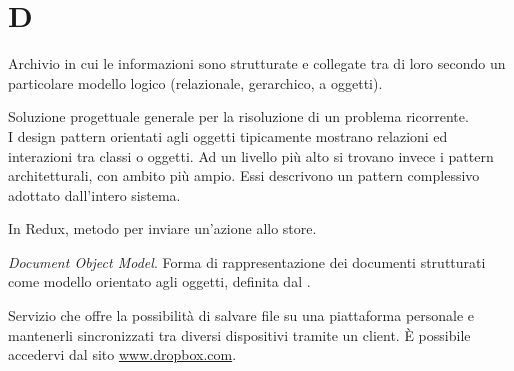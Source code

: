 \section{D}

Archivio in cui le informazioni sono strutturate e collegate tra di loro secondo un particolare modello logico (relazionale, gerarchico, a oggetti).

Soluzione progettuale generale per la risoluzione di un problema ricorrente. \\

I design pattern orientati agli oggetti tipicamente mostrano relazioni ed interazioni tra classi o oggetti. 
Ad un livello più alto si trovano invece i pattern architetturali, con ambito più ampio. Essi descrivono un pattern complessivo adottato dall'intero sistema.

	In Redux, metodo per inviare un'azione allo store.

\textit{Document Object Model}. Forma di rappresentazione dei documenti strutturati come modello orientato agli oggetti, definita dal .

Servizio che offre la possibilità di salvare file su una piattaforma  personale e
mantenerli sincronizzati tra diversi dispositivi tramite un client. È possibile accedervi dal sito \href{http://www.dropbox.com}{www.dropbox.com}.
